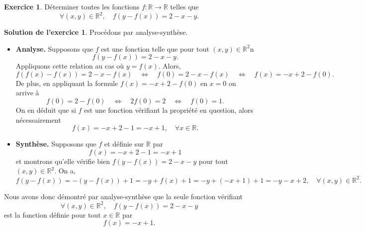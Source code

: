 \documentclass[a4paper, 11pt,openany]{article}%
\theoremstyle{plain}
\theoremstyle{definition}
\newtheorem{exo}{Exercice}
\newtheorem{sol}{Solution de l'exercice}
\theoremstyle{remark}
\newcommand{\R}{\mathbb{R}}
\begin{document}
\begin{exo}
Déterminer toutes les fonctions $f\colon \mathbb R \to \mathbb R$ telles que $$\forall (x,y)\in\mathbb R^2, \quad f(y-f(x))=2-x-y.$$
\end{exo}

\begin{sol}
Procédons par analyse-synthèse.
 \begin{itemize}
 \item \textbf{Analyse.} Supposons que $f$ est une fonction telle que pour tout $(x,y) \in \R^2$n
 \[f(y - f(x)) = 2 - x - y.\]
 Appliquons cette relation au cas où $y =f(x)$. Alors,
 \[f(f(x) - f(x)) = 2 - x - f(x) \quad \Leftrightarrow \quad f(0) = 2 - x - f(x) \quad \Leftrightarrow \quad f(x) = -x + 2 - f(0).\]
 De plus, en appliquant la formule $f(x) = -x+2-f(0)$ en $x=0$ on arrive à 
 \[f(0) = 2 - f(0) \quad \Leftrightarrow \quad 2 f(0) = 2 \quad \Leftrightarrow \quad  f(0) = 1.\]
 On en déduit que si $f$ est une fonction vérifiant la propriété en question, alors nécessairement
 \[ f(x) =  -x + 2 - 1 = -x+1, \quad \forall x\in \R.\]
  \item \textbf{Synthèse.} Supposons que $f$ et définie sur $\R$ par
  \[ f(x) =  -x + 2 - 1 = -x+1\]
  et montrons qu'elle vérifie bien $f(y-f(x))=2-x-y$ pour tout $(x,y)\in\mathbb R^2$. On a,
  \[ f(y-f(x))= -(y-f(x)) + 1 = -y+f(x)+1 = -y + (-x+1) + 1 = -y - x +2, \quad \forall (x,y)\in\mathbb R^2.\]
 \end{itemize}
 Nous avons donc démontré par analyse-synthèse que la seule fonction vérifiant 
 $$\forall (x,y)\in\mathbb R^2, \quad  f(y-f(x))=2-x-y$$
 est la fonction définie pour tout $x\in \R$ par
   \[ f(x)  = -x+1.\]
\end{sol}
\end{document}

